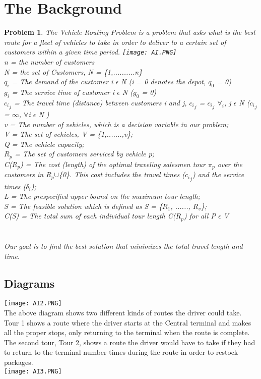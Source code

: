 \documentclass[11pt]{article}
\newcommand{\<}{\langle}
\renewcommand{\>}{\rangle}
\newtheorem*{problem}{Problem}
\theoremstyle{definition}
\begin{document}
    \section{The Background} 
    \begin{problem}
    The Vehicle Routing Problem is a problem that asks what is the best route for a fleet of vehicles to take in order to deliver to a certain set of customers within a given time period.
    \texttt{[image: AI.PNG]}\\
    n = the number of customers\\
    N = the set of Customers, N = \{1,..........n\}\\
    $q_i$ = The demand of the customer i $\epsilon$ N (i = 0 denotes the depot, $q_0$ = 0)\\
    $g_i$ = The service time of customer i $\epsilon$ N ($g_0$ = 0)\\
    ${c_i}_j$ = The travel time (distance) between customers i and j, ${c_i}_j$ = ${c_i}_j$ $\forall_i$, j $\epsilon$ N (${c_i}_j$ = $\infty$, $\forall$i $\epsilon$ N )\\
    v = The number of vehicles, which is a \textit{decision} variable in our problem;\\
    V = The set of vehicles, V = \{1,.......,v\};\\
    Q = The vehicle capacity;\\
    $R_p$ = The set of customers serviced by vehicle p;\\
    C($R_p$) = The cost (length) of the optimal traveling salesmen tour $\pi_p$ over the customers in 
    $R_p$$\cup$\{0\}. This cost includes the travel times (${c_i}_j$) and the service times ($\delta_i$);\\
    L = The prespecified upper bound on the maximum tour length;\\
    S = The feasible solution which is defined as S = \{$R_1$, ......, $R_v$\};\\
    C(S) = The total sum of each individual tour length C($R_p$) for all P $\epsilon$ V\\\\\\
    Our goal is to find the best solution  that minimizes the total travel length and time.
    \end{problem}
    \subsection{Diagrams}
    \texttt{[image: AI2.PNG]}\\
    The above diagram shows two different kinds of routes the driver could take. Tour 1 shows a route where the driver starts at the Central terminal and makes all the proper stops, only returning to the terminal when the route is complete. The second tour, Tour 2, shows a route the driver would have to take if they had to return to the terminal number times during the route in order to restock packages.\\
    \texttt{[image: AI3.PNG]}\\
    
\end{document}
